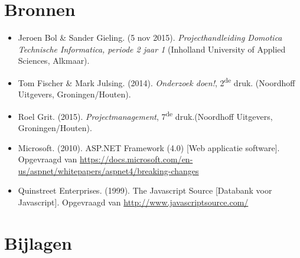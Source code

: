 \documentclass[11pt]{article}
\begin{document}
\section{Bronnen}
\begin{itemize}
	\item Jeroen Bol \& Sander Gieling. (5 nov 2015). \textit{Projecthandleiding Domotica Technische Informatica, periode 2 jaar 1} (Inholland University of Applied Sciences, Alkmaar).  
	\item Tom Fischer \& Mark Julsing. (2014). \textit{Onderzoek doen!}, 2\textsuperscript{de} druk. (Noordhoff Uitgevers, Groningen/Houten).
	\item Roel Grit. (2015). \textit{Projectmanagement}, 7\textsuperscript{de} druk.(Noordhoff Uitgevers, Groningen/Houten).
	\item Microsoft. (2010). ASP.NET Framework (4.0) [Web applicatie software]. Opgevraagd van \url{https://docs.microsoft.com/en-us/aspnet/whitepapers/aspnet4/breaking-changes}
	\item Quinstreet Enterprises. (1999). The Javascript Source [Databank voor Javascript]. Opgevraagd van \url{http://www.javascriptsource.com/}
\end{itemize}




\section{Bijlagen}
\end{document}
